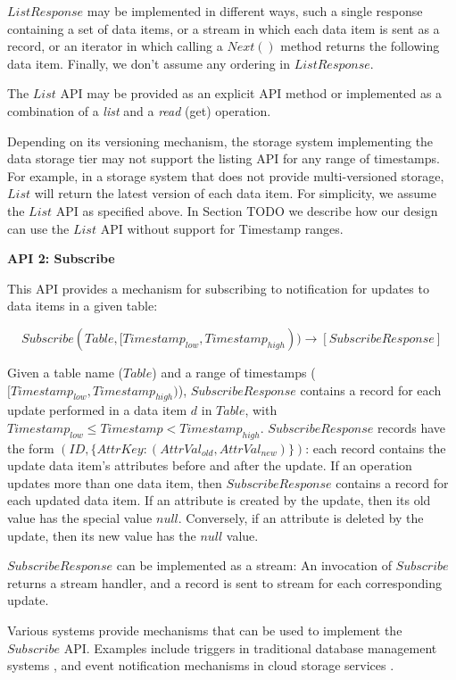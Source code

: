 $ListResponse$ may be implemented in different ways, such a single response containing a set of
data items, or a stream in which each data item is sent as a record, or an iterator in which calling a $Next()$ method
returns the following data item.
Finally, we don't assume any ordering in $ListResponse$.

The $List$ API may be provided as an explicit API method or implemented as a combination of a \textit{list} and a
\textit{read} (get) operation.

Depending on its versioning mechanism, the storage system implementing the data storage tier may not support the
listing API for any range of timestamps.
For example, in a storage system that does not provide multi-versioned storage, $List$ will return the latest version of
each data item.
For simplicity, we assume the $List$ API as specified above.
In Section
TODO
we describe how our design can use the $List$ API without support for Timestamp ranges.

\bigskip

\noindent
\textbf{API 2: Subscribe}

\noindent
This API provides a mechanism for subscribing to notification for updates to data items in a given table:

\[
  Subscribe(Table, [Timestamp_{low}, Timestamp_{high})) \rightarrow [SubscribeResponse]
\]

\noindent
\begin{sloppypar}
Given a table name ($Table$) and a range of timestamps ($[Timestamp_{low}, Timestamp_{high})$),
$SubscribeResponse$ contains a record for each update performed in a data item $d$ in $Table$, with
$Timestamp_{low} \leq Timestamp < Timestamp_{high}$.
$SubscribeResponse$ records have the form $(ID, \{AttrKey: (AttrVal_{old}, AttrVal_{new})\})$:
each record contains the update data item's attributes before and after the update.
If an operation updates more than one data item, then $SubscribeResponse$ contains a record for each updated data item.
If an attribute is created by the update, then its old value has the special value $null$.
Conversely, if an attribute is deleted by the update, then its new value has the $null$ value.
\end{sloppypar}

$SubscribeResponse$ can be implemented as a stream:
An invocation of $Subscribe$ returns a stream handler, and a record is sent to stream for each corresponding update.

Various systems provide mechanisms that can be used to implement the $Subscribe$ API.
Examples include triggers in traditional database management systems \cite{mariadb:triggers}, and event notification
mechanisms in cloud storage services \cite{awss3:notifications}.

